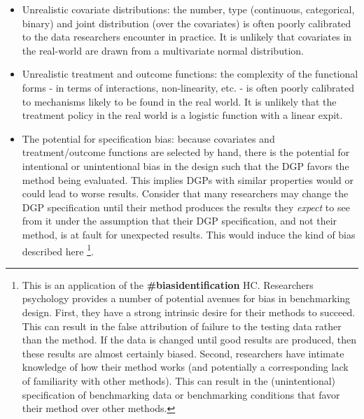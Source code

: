 \documentclass[../main.tex]{subfiles}
\begin{document}
\vspace{\baselineskip}
\begin{itemize}
    \item Unrealistic covariate distributions: the number, type (continuous, categorical, binary) and joint distribution (over the covariates) is often poorly calibrated to the data researchers encounter in practice. It is unlikely that covariates in the real-world are drawn from a multivariate normal distribution.\par


\vspace{\baselineskip}
    \item Unrealistic treatment and outcome functions: the complexity of the functional forms - in terms of interactions, non-linearity, etc. - is often poorly calibrated to mechanisms likely to be found in the real world. It is unlikely that the treatment policy in the real world is a logistic function with a linear expit.\par


\vspace{\baselineskip}
    \item The potential for specification bias: because covariates and treatment/outcome functions are selected by hand, there is the potential for intentional or unintentional bias in the design such that the DGP favors the method being evaluated. This implies DGPs with similar properties would or could lead to worse results. Consider that many researchers may change the DGP specification until their method produces the results they \textit{expect} to see from it under the assumption that their DGP specification, and not their method, is at fault for unexpected results. This would induce the kind of bias described here \footnote{This is an application of the \textbf{\#biasidentification} HC. Researchers psychology provides a number of potential avenues for bias in benchmarking design. First, they have a strong intrinsic desire for their methods to succeed. This can result in the false attribution of failure to the testing data rather than the method. If the data is changed until good results are produced, then these results are almost certainly biased. Second, researchers have intimate knowledge of how their method works (and potentially a corresponding lack of familiarity with other methods). This can result in the (unintentional) specification of benchmarking data or benchmarking conditions that favor their method over other methods.}.
\end{itemize}\par
\end{document}
